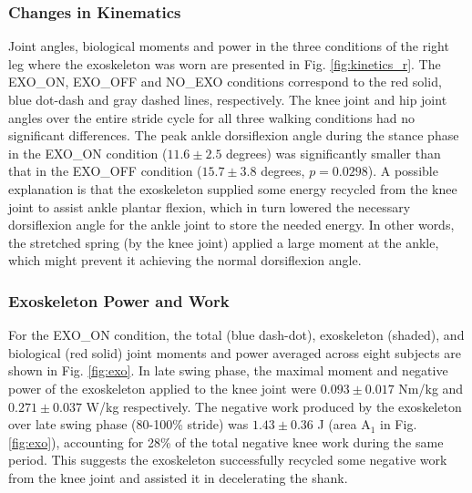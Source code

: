 \documentclass[10pt]{asme2ej}
\begin{document}
\subsubsection{Changes in Kinematics}
Joint angles, biological moments and power in the three conditions of the right leg where the exoskeleton was worn are presented in Fig. \ref{fig:kinetics_r}.
The EXO\_ON, EXO\_OFF and NO\_EXO conditions correspond to the red solid, blue dot-dash and gray dashed lines, respectively.
The knee joint and hip joint angles over the entire stride cycle for all three walking conditions had no significant differences.
The peak ankle dorsiflexion angle during the stance phase in the EXO\_ON condition ($11.6\pm2.5$ degrees) was significantly smaller than that in the EXO\_OFF condition ($15.7\pm3.8$ degrees, $p=0.0298$).
A possible explanation is that the exoskeleton supplied some energy recycled from the knee joint to assist ankle plantar flexion, which in turn lowered the necessary dorsiflexion angle for the ankle joint to store the needed energy.
In other words, the stretched spring (by the knee joint) applied a large moment at the ankle, which might prevent it achieving the normal dorsiflexion angle.

\begin{figure*}[th]
	\caption{Right leg joint kinematics and kinetics.
		The joint angle, biological moment and power (from top to bottom) are shown for the ankle, knee and hip joints (from left to right) for the EXO\_ON (red solid line), EXO\_OFF (blue dash-dot line) and NO\_EXO (gray dashed line) conditions.
		The stance phase and swing phase are separated by black dotted lines.
		The markers $*$ and $\circ$ indicate significant differences ($p<0.05$) comparing the EXO\_ON condition to the EXO\_OFF condition and the NO\_EXO condition, respectively.}
	\label{fig:kinetics_r}
\end{figure*}

\subsubsection{Exoskeleton Power and Work}
For the EXO\_ON condition, the total (blue dash-dot), exoskeleton (shaded), and biological (red solid) joint moments and power averaged across eight subjects are shown in Fig. \ref{fig:exo}.
In late swing phase, the maximal moment and negative power of the exoskeleton applied to the knee joint were $0.093\pm0.017$ Nm/kg and $0.271\pm0.037$ W/kg respectively.
The negative work produced by the exoskeleton over late swing phase (80-100\% stride) was $1.43\pm0.36$ J (area A$_{1}$ in Fig. \ref{fig:exo}), accounting for 28\% of the total negative knee work during the same period.
This suggests the exoskeleton successfully recycled some negative work from the knee joint and assisted it in decelerating the shank.
\end{document}
